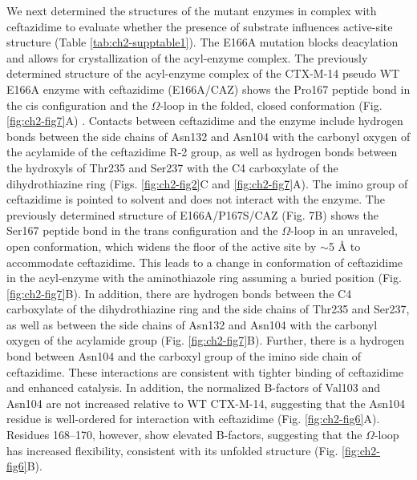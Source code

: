 \documentclass[../main.tex]{subfiles}
\begin{document}
        We next determined the structures of the mutant enzymes in complex with ceftazidime to evaluate whether the presence of substrate influences active-site structure (Table \ref{tab:ch2-supptable1}). The E166A mutation blocks deacylation and allows for crystallization of the acyl-enzyme complex\cite{strynadka_molecular_1992}. The previously determined structure of the acyl-enzyme complex of the CTX-M-14 pseudo WT E166A enzyme with ceftazidime (E166A/CAZ) shows the Pro167 peptide bond in the cis configuration and the $\Omega$-loop in the folded, closed conformation (Fig. \ref{fig:ch2-fig7}A) \cite{patel_drug-resistant_2017}. Contacts between ceftazidime and the enzyme include hydrogen bonds between the side chains of Asn132 and Asn104 with the carbonyl oxygen of the acylamide of the ceftazidime R-2 group, as well as hydrogen bonds between the hydroxyls of Thr235 and Ser237 with the C4 carboxylate of the dihydrothiazine ring (Figs. \ref{fig:ch2-fig2}C and \ref{fig:ch2-fig7}A). The imino group of ceftazidime is pointed to solvent and does not interact with the enzyme. The previously determined structure of E166A/P167S/CAZ (Fig. 7B) shows the Ser167 peptide bond in the trans configuration and the $\Omega$-loop in an unraveled, open conformation, which widens the floor of the active site by $\sim$5 \AA{} to accommodate ceftazidime\cite{patel_drug-resistant_2017}. This leads to a change in conformation of ceftazidime in the acyl-enzyme with the aminothiazole ring assuming a buried position (Fig. \ref{fig:ch2-fig7}B)\cite{patel_drug-resistant_2017}. In addition, there are hydrogen bonds between the C4 carboxylate of the dihydrothiazine ring and the side chains of Thr235 and Ser237, as well as between the side chains of Asn132 and Asn104 with the carbonyl oxygen of the acylamide group (Fig. \ref{fig:ch2-fig7}B). Further, there is a hydrogen bond between Asn104 and the carboxyl group of the imino side chain of ceftazidime. These interactions are consistent with tighter binding of ceftazidime and enhanced catalysis\cite{patel_drug-resistant_2017}. In addition, the normalized B-factors of Val103 and Asn104 are not increased relative to WT CTX-M-14, suggesting that the Asn104 residue is well-ordered for interaction with ceftazidime (Fig. \ref{fig:ch2-fig6}A). Residues 168–170, however, show elevated B-factors, suggesting that the $\Omega$-loop has increased flexibility, consistent with its unfolded structure (Fig. \ref{fig:ch2-fig6}B).
\end{document}

